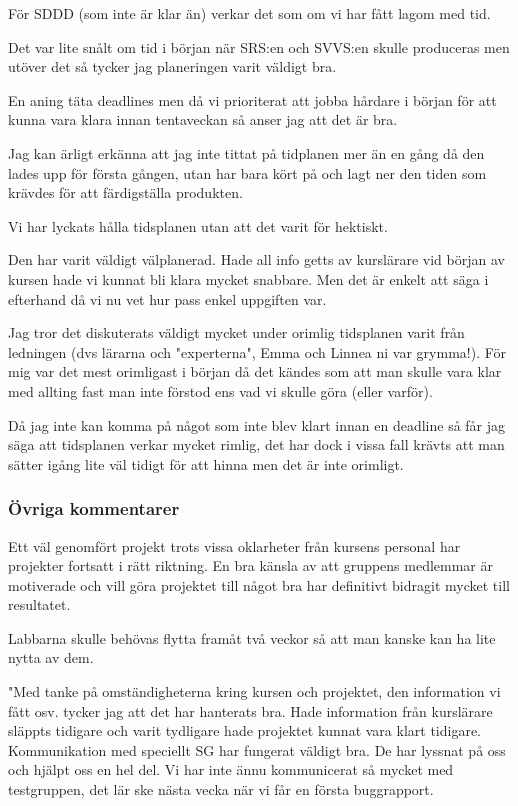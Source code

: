 \documentclass[a4paper]{article}
\begin{document}
För SDDD (som inte är klar än) verkar det som om vi har fått lagom med tid.

Det var lite snålt om tid i början när SRS:en och SVVS:en skulle produceras men utöver det så tycker jag planeringen varit väldigt bra.

En aning täta deadlines men då vi prioriterat att jobba hårdare i början för att kunna vara klara innan tentaveckan så anser jag att det är bra. 

Jag kan ärligt erkänna att jag inte tittat på tidplanen mer än en gång då den lades upp för första gången, utan har bara kört på och lagt ner den tiden som krävdes för att färdigställa produkten.

Vi har lyckats hålla tidsplanen utan att det varit för hektiskt. 

Den har varit väldigt välplanerad. Hade all info getts av kurslärare vid början av kursen hade vi kunnat bli klara mycket snabbare. Men det är enkelt att säga i efterhand då vi nu vet hur pass enkel uppgiften var.

Jag tror det diskuterats väldigt mycket under orimlig tidsplanen varit från ledningen (dvs lärarna och "experterna", Emma och Linnea ni var grymma!). För mig var det mest orimligast i början då det kändes som att man skulle vara klar med allting fast man inte förstod ens vad vi skulle göra (eller varför).

Då jag inte kan komma på något som inte blev klart innan en deadline så får jag säga att tidsplanen verkar mycket rimlig, det har dock i vissa fall krävts att man sätter igång lite väl tidigt för att hinna men det är inte orimligt.


\subsubsection{Övriga kommentarer}
Ett väl genomfört projekt trots vissa oklarheter från kursens personal har projekter fortsatt i rätt riktning. En bra känsla av att gruppens medlemmar är motiverade och vill göra projektet till något bra har definitivt bidragit mycket till resultatet.

Labbarna skulle behövas flytta framåt två veckor så att man kanske kan ha lite nytta av dem.

"Med tanke på omständigheterna kring kursen och projektet, den information vi fått osv. tycker jag att det har hanterats bra. Hade information från kurslärare släppts tidigare och varit tydligare hade projektet kunnat vara klart tidigare.
Kommunikation med speciellt SG har fungerat väldigt bra. De har lyssnat på oss och hjälpt oss en hel del. Vi har inte ännu kommunicerat så mycket med testgruppen, det lär ske nästa vecka när vi får en första buggrapport.
\end{document}
